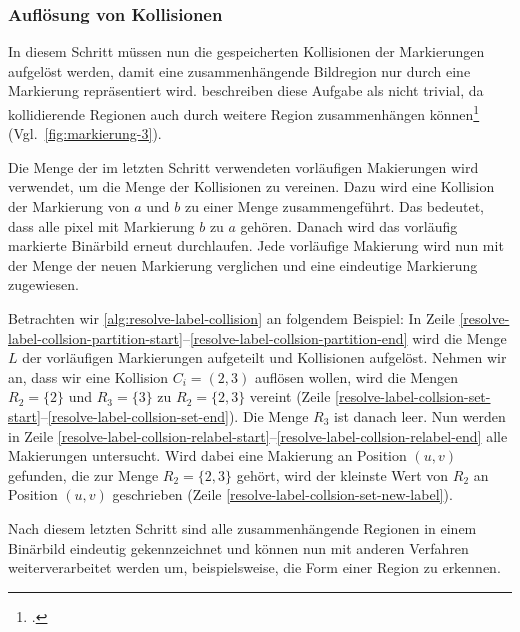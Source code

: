 
\subsubsection{Auflösung von Kollisionen} %
\label{sec:auflösung_von_kollisionen}

In diesem Schritt müssen nun die gespeicherten Kollisionen der Markierungen aufgelöst werden, damit eine
 zusammenhängende Bildregion nur durch eine Markierung repräsentiert wird. \citeauthor{burger05} beschreiben diese
 Aufgabe  als nicht trivial, da kollidierende Regionen auch durch weitere Region zusammenhängen
 können\footcite[Vgl.][S.~205]{burger05} (Vgl.~\autoref{fig:markierung-3}).

Die Menge der im letzten Schritt verwendeten vorläufigen Makierungen wird verwendet, um die Menge der Kollisionen
 zu vereinen. Dazu wird eine Kollision der Markierung von $a$ und $b$ zu einer Menge zusammengeführt. Das bedeutet,
 dass alle \gls{pixel} mit Markierung $b$ zu $a$ gehören. Danach wird das vorläufig markierte Binärbild erneut
 durchlaufen. Jede vorläufige Makierung wird nun mit der Menge der neuen Markierung verglichen und eine eindeutige
 Markierung zugewiesen.

Betrachten wir \autoref{alg:resolve-label-collision} an folgendem Beispiel: In Zeile
 \ref{resolve-label-collsion-partition-start}--\ref{resolve-label-collsion-partition-end} wird die Menge $L$ der
 vorläufigen Markierungen aufgeteilt und Kollisionen aufgelöst. Nehmen wir an, dass wir eine Kollision $C_i = (2,3)$
 auflösen wollen, wird die Mengen $R_2 = \{2\}$ und $R_3 = \{3\}$  zu $R_2 = \{2,3\}$ vereint
 (Zeile \ref{resolve-label-collsion-set-start}--\ref{resolve-label-collsion-set-end}). Die Menge $R_3$ ist danach leer.
 Nun werden in Zeile \ref{resolve-label-collsion-relabel-start}--\ref{resolve-label-collsion-relabel-end} alle
 Makierungen untersucht. Wird dabei eine Makierung an Position $(u,v)$ gefunden, die zur Menge $R_2 = \{2,3\}$ gehört,
 wird der kleinste Wert von $R_2$ an Position $(u,v)$ geschrieben (Zeile \ref{resolve-label-collsion-set-new-label}).



Nach diesem letzten Schritt sind alle zusammenhängende Regionen in einem Binärbild eindeutig gekennzeichnet und können nun mit anderen Verfahren weiterverarbeitet werden um, beispielsweise, die Form einer Region zu erkennen.



